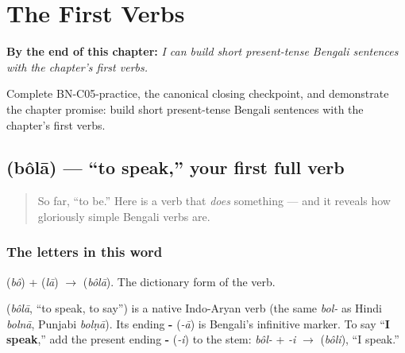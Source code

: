 
\chapter{The First Verbs}
\label{ch:first-verbs}

\begin{chapteropening}
\textbf{By the end of this chapter:} \emph{I can build short present-tense Bengali sentences with the chapter's first verbs.}

Complete BN-C05-practice, the canonical closing checkpoint, and demonstrate the chapter promise: build short present-tense Bengali sentences with the chapter's first verbs.
\end{chapteropening}

\section[\bn{বলা}]{ (bôlā) — \textquotedblleft{}to speak,\textquotedblright{} your first full verb}

\label{lesson:BN-C05-bola}



\begin{quote}
So far, \textquotedblleft{}to be.\textquotedblright{} Here is a verb that \emph{does} something — and it reveals how gloriously simple Bengali verbs are.
\end{quote}

\subsection*{The letters in this word}
\textbf{} (\emph{bô}) + \textbf{} (\emph{lā}) $\to$ \textbf{} (\emph{bôlā}). The dictionary form of the verb.

\begin{cousinweb}
\textbf{} (\emph{bôlā}, \textquotedblleft{}to speak, to say\textquotedblright{}) is a native Indo-Aryan verb (the same \emph{bol-} as Hindi \emph{bolnā}, Punjabi \emph{bolṇā}). Its ending \textbf{-} (\emph{-ā}) is Bengali's infinitive marker. To say \textquotedblleft{}\textbf{I speak},\textquotedblright{} add the present ending \textbf{-} (\emph{-i}) to the stem: \emph{bôl-} + \emph{-i} $\to$ \textbf{} (\emph{bôli}), \textquotedblleft{}I speak.\textquotedblright{}
\end{cousinweb}

